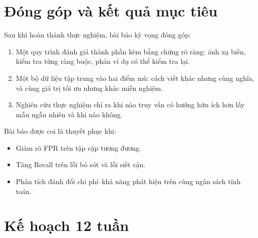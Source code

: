 \documentclass[11pt,a4paper]{article}
\theoremstyle{plain}
\theoremstyle{definition}
\theoremstyle{remark}
\begin{document}
\section{Đóng góp và kết quả mục tiêu}

Sau khi hoàn thành thực nghiệm, bài báo kỳ vọng đóng góp:

\begin{enumerate}
  \item Một quy trình đánh giá thành phần kèm bằng chứng rõ ràng:
    ánh xạ biến, kiểm tra từng ràng buộc, phản ví dụ có thể kiểm tra lại.
  \item Một bộ dữ liệu tập trung vào hai điểm mù: cách viết khác nhưng cùng nghĩa,
    và cùng giá trị tối ưu nhưng khác miền nghiệm.
  \item Nghiên cứu thực nghiệm chỉ ra khi nào truy vấn có hướng hữu ích hơn
    lấy mẫu ngẫu nhiên và khi nào không.
\end{enumerate}

Bài báo được coi là thuyết phục khi:
\begin{itemize}
  \item Giảm rõ FPR trên tập cặp tương đương.
  \item Tăng Recall trên lỗi bỏ sót và lỗi siết cận.
  \item Phân tích đánh đổi chi phí--khả năng phát hiện trên cùng ngân sách tính toán.
\end{itemize}

\section{Kế hoạch 12 tuần}
\label{sec:plan}
\end{document}
